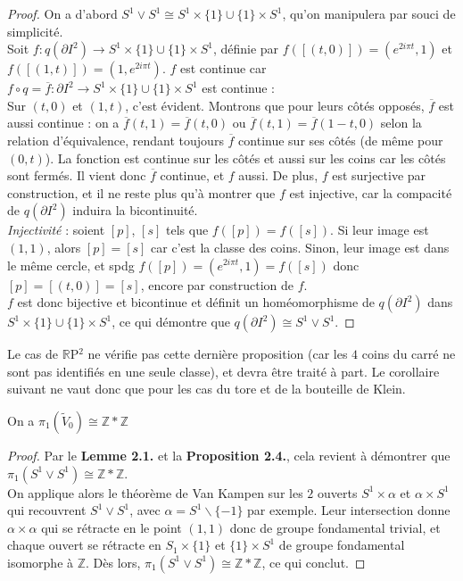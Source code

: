 \begin{proof}
    On a d'abord $S^1\vee S^1\cong S^1\times\{1\}\cup\{1\}\times S^1$, qu'on manipulera par souci de simplicité.\\
    Soit $f:q(\partial I^2)\rightarrow S^1\times\{1\}\cup\{1\}\times S^1$, définie par $f([(t,0)])=(e^{2i\pi t},1)$ et $f([(1,t)])=(1,e^{2i\pi t})$. $f$ est continue car $f\circ q=\overline{f}:\partial I^2\rightarrow S^1\times\{1\}\cup\{1\}\times S^1$ est continue :\medskip\\
    Sur $(t,0)$ et $(1,t)$, c'est évident. Montrons que pour leurs côtés opposés, $\overline{f}$ est aussi continue : on a $\overline{f}(t,1)=\overline{f}(t,0)$ ou $\overline{f}(t,1)=\overline{f}(1-t,0)$ selon la relation d'équivalence, rendant toujours $\overline{f}$ continue  sur ses côtés (de même pour $(0,t)$). La fonction est continue sur les côtés et aussi sur les coins car les côtés sont fermés. Il vient donc $\overline{f}$ continue, et $f$ aussi. De plus, $f$ est surjective par construction, et il ne reste plus qu'à montrer que $f$ est injective, car la compacité de $q(\partial I^2)$ induira la bicontinuité.\medskip\\
    \textit{Injectivité} : soient $[p]$, $[s]$ tels que $f([p])=f([s])$. Si leur image est $(1,1)$, alors $[p]=[s]$ car c'est la classe des coins. Sinon, leur image est dans le même cercle, et spdg $f([p])=(e^{2i\pi t},1)=f([s])$ donc $[p]=[(t,0)]=[s]$, encore par construction de $f$.\medskip\\
    $f$ est donc bijective et bicontinue et définit un homéomorphisme de $q(\partial I^2)$ dans $S^1\times\{1\}\cup\{1\}\times S^1$, ce qui démontre que $q(\partial I^2)\cong S^1\vee S^1$.
\end{proof}
Le cas de $\mathbb{R}$P$^2$ ne vérifie pas cette dernière proposition (car les $4$ coins du carré ne sont pas identifiés en une seule classe), et devra être traité à part. Le corollaire suivant ne vaut donc que pour les cas du tore et de la bouteille de Klein.
\begin{corollaire}
    On a $\pi_1(\tilde{V}_0)\cong\mathbb{Z}*\mathbb{Z}$
\end{corollaire}
\begin{proof}
    Par le \textbf{Lemme 2.1.} et la \textbf{Proposition 2.4.}, cela revient à démontrer que $\pi_1(S^1\vee S^1)\cong\mathbb{Z}*\mathbb{Z}$.\medskip\\
    On applique alors le théorème de Van Kampen sur les $2$ ouverts $S^1\times\alpha$ et $\alpha\times S^1$ qui recouvrent $S^1\vee S^1$, avec $\alpha=S^1\backslash\{-1\}$ par exemple. Leur intersection donne $\alpha\times\alpha$ qui se rétracte en le point $(1,1)$ donc de groupe fondamental trivial, et chaque ouvert se rétracte en $S_1\times\{1\}$ et $\{1\}\times S^1$ de groupe fondamental isomorphe à $\mathbb{Z}$. Dès lors, $\pi_1(S^1\vee S^1)\cong\mathbb{Z}*\mathbb{Z}$, ce qui conclut.
\end{proof}
